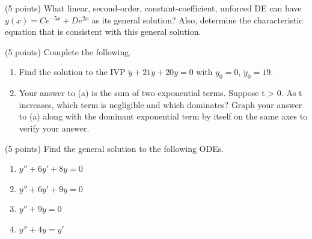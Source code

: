 \documentclass[11pt,letterpaper,boxed]{hmcpset}
\begin{document}


\begin{problem}[1]
(5 points) What linear, second-order, constant-coefficient, unforced DE can have $y(x) = Ce^{-5x} + De^{2x}$ as its general solution? Also, determine the characteristic equation that is consistent with this general solution.
\end{problem}


\pagebreak


\begin{problem}[2]
(5 points) Complete the following.

\begin{enumerate}
\item Find the solution to the IVP $\ddot y + 21\dot y + 20y = 0$ with $y_0 = 0$, $\ddot y_0 = 19$.
\item Your answer to (a) is the sum of two exponential terms. Suppose t > 0. As t increases, which term is negligible and which dominates? Graph your answer to (a) along with the dominant exponential term by itself on the same axes to verify your answer.
\end{enumerate}
\end{problem}


\pagebreak


\begin{problem}[3]
(5 points) Find the general solution to the following ODEs.

\begin{enumerate}
\item $y'' + 6y' + 8y = 0$
\item $y'' + 6y' + 9y = 0$
\item $y'' + 9y = 0$
\item $y'' + 4y = y'$
\end{enumerate}
\end{problem}

\end{document}
